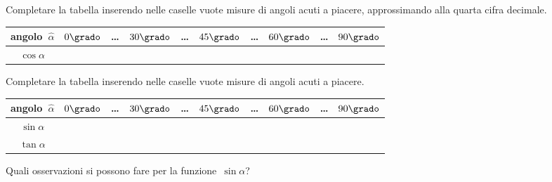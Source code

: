 \begin{esercizio}
\label{ese:G.3}
Completare la tabella inserendo nelle caselle vuote misure di angoli acuti a 
piacere, approssimando alla quarta cifra decimale.
\begin{center}
\begin{tabular}{cccccccccc}
\toprule
angolo~\(\hat{\alpha}\) & \(0\grado\) & \ldots & \(30\grado\) & \ldots & \(45\grado\) & 
\ldots & \(60\grado\) & \ldots & \(90\grado\)\\
\midrule
\(\cos \alpha\) & & & & & & & & & \\
\bottomrule
\end{tabular}
\end{center}
\end{esercizio}

\begin{esercizio}
\label{ese:G.4}
Completare la tabella inserendo nelle caselle vuote misure di angoli acuti a 
piacere.
\begin{center}
\begin{tabular}{cccccccccc}
\toprule
angolo~\(\hat{\alpha}\) & \(0\grado\) & \ldots & \(30\grado\) & \ldots & \(45\grado\) & 
\ldots & \(60\grado\) & \ldots & \(90\grado\)\\
\midrule
\(\sin \alpha\) & & & & &  &  &  &  &  \\
\(\tan \alpha\) & & &  &  &  &  &  &  &  \\
\bottomrule
\end{tabular}
\end{center}

Quali osservazioni si possono fare per la funzione~\(\sin \alpha\)?
\end{esercizio}

